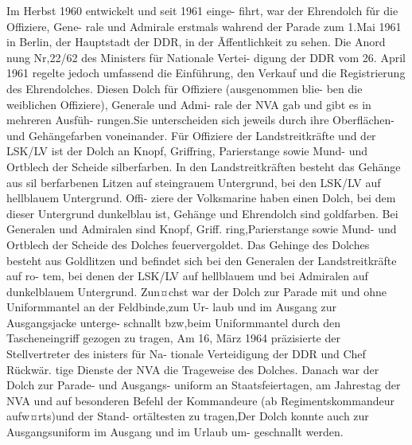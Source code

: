 

Im Herbst 1960 entwickelt und seit 1961 einge-
fihrt, war der Ehrendolch fǔr die Offiziere, Gene-
rale und Admirale erstmals wahrend der Parade
zum 1.Mai 1961 in Berlin, der Hauptstadt der
DDR, in der Ãffentlichkeit zu sehen. Die Anord
nung Nr,22/62 des Ministers für Nationale Vertei-
digung der DDR vom 26. April 1961 regelte jedoch
umfassend die Einführung, den Verkauf und die
Registrierung des Ehrendolches.
Diesen Dolch für Offiziere (ausgenommen blie-
ben die weiblichen Offiziere), Generale und Admi-
rale der NVA gab und gibt es in mehreren Ausfüh-
rungen.Sie unterscheiden sich jeweils durch ihre
Oberflächen- und Gehängefarben voneinander. Für
Offiziere der Landstreitkräfte und der LSK/LV ist
der Dolch an Knopf, Griffring, Parierstange sowie
Mund- und Ortblech der Scheide silberfarben. In
den Landstreitkräften besteht das Gehänge aus sil
berfarbenen Litzen auf steingrauem Untergrund,
bei den LSK/LV auf hellblauem Untergrund. Offi-
ziere der Volksmarine haben einen Dolch, bei dem dieser Untergrund dunkelblau ist, Gehänge und
Ehrendolch sind goldfarben.
Bei Generalen und Admiralen sind Knopf, Griff.
ring,Parierstange sowie Mund- und Ortblech der
Scheide des Dolches feuervergoldet. Das Gehinge
des Dolches besteht aus Goldlitzen und befindet
sich bei den Generalen der Landstreitkräfte auf ro-
tem, bei denen der LSK/LV auf hellblauem und bei
Admiralen auf dunkelblauem Untergrund.
Zun¤chst war der Dolch zur Parade mit und
ohne Uniformmantel an der Feldbinde,zum Ur-
laub und im Ausgang zur Ausgangsjacke unterge-
schnallt bzw,beim Uniformmantel durch den Tascheneingriff gezogen zu tragen, Am 16, März 1964
präzisierte der Stellvertreter des inisters für Na-
tionale Verteidigung der DDR und Chef Rückwär.
tige Dienste der NVA die Trageweise des Dolches.
Danach war der Dolch zur Parade- und Ausgangs-
uniform an Staatsfeiertagen, am Jahrestag der NVA
und auf besonderen Befehl der Kommandeure (ab
Regimentskommandeur aufw¤rts)und der Stand-
ortältesten zu tragen,Der Dolch konnte auch zur
Ausgangsuniform im Ausgang und im Urlaub um-
geschnallt werden.
